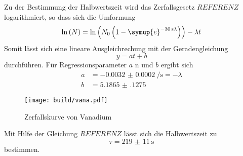Zu der Bestimmung der Halbwertszeit wird das Zerfallsgesetz $REFERENZ$ logarithmiert, so dass sich die Umformung
\begin{equation}
\ln \left (N \right ) = \ln \left (N_0 \left (1-\symup{e}^{\SI{-30}{\second} \lambda} \right ) \right )   - \lambda t 
\end{equation}
Somit lässt sich eine lineare Ausgleichrechung mit der Geradengleichung
\begin{equation}
    y = at + b 
\end{equation}
durchführen. 
Für Regressionsparameter $a$ n und $b$ ergibt sich
\begin{align*}
    a &= \SI{-0.0032(2)}{\per\second} = - \lambda\\
    b &= \num{5.1865(1275)}
\end{align*}
\begin{figure}
    \centering
    \caption{Zerfallskurve von Vanadium}
    \label{fig:vana}
    \texttt{[image: build/vana.pdf]}
\end{figure}
Mit Hilfe der Gleichung $REFERENZ$ lässt sich die Halbwertszeit zu
\begin{equation*}
\tau = \SI{219(11)}{\second}
\end{equation*}
bestimmen.
